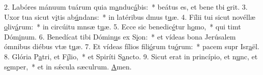 2. Labóres mánuum tuárum quia m\uline{a}nduc\uline{á}bis:~* beátus es, et bene tbi \uline{e}rit.
3. Uxor tua sicut v\uline{i}tis ab\uline{ú}ndans:~* in latéribus dmus t\uline{u}æ.
4. Fílii tui sicut novéllæ \uline{o}liv\uline{á}rum:~* in circúitu mnsæ t\uline{u}æ.
5. Ecce sic benedic\uline{é}tur h\uline{o}mo,~* qui timt Dóm\uline{i}num.
6. Benedícat tibi Dómin\uline{u}s ex S\uline{i}on:~* et vídeas bona Jerúsalem ómnibus diébus vtæ t\uline{u}æ.
7. Et vídeas fílios fili\uline{ó}rum tu\uline{ó}rum:~* pacem supr Isr\uline{a}ël.
8. Glória P\uline{a}tri, et F\uline{í}lio,~* et Spiríti S\uline{a}ncto.
9. Sicut erat in princípio, et n\uline{u}nc, et s\uline{e}mper,~* et in sǽcula sæculrum. \uline{A}men.
